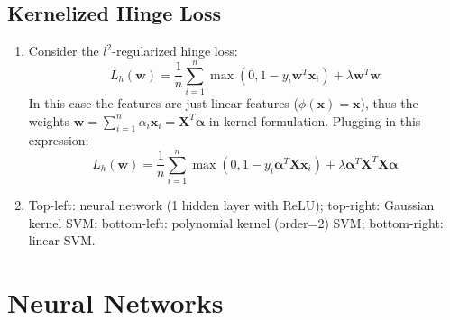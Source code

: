 \documentclass[a4paper, 10pt]{article}
\begin{document}
\subsection{Kernelized Hinge Loss}
\begin{enumerate}[label=(\alph*)]
    \item Consider the $l^2$-regularized hinge loss:
    \begin{equation}
        L_h(\mathbf{w}) = \frac{1}{n} \sum_{i=1}^n \max \left(0, 1 - y_i \mathbf{w}^T \mathbf{x}_i\right) + \lambda \mathbf{w}^T \mathbf{w}
    \end{equation}
    In this case the features are just linear features ($\phi(\mathbf{x}) = \mathbf{x}$), thus the weights $\mathbf{w} = \sum_{i=1}^n \alpha_i \mathbf{x}_i = \mathbf{X}^T \bm{\alpha}$ in kernel formulation. Plugging in this expression:
    \begin{equation}
        L_h(\mathbf{w}) = \frac{1}{n} \sum_{i=1}^n \max \left(0, 1 - y_i \bm{\alpha}^T \mathbf{X} \mathbf{x}_i\right) + \lambda \bm{\alpha}^T \mathbf{X}^T \mathbf{X} \bm{\alpha}
    \end{equation}
    
    \item Top-left: neural network (1 hidden layer with ReLU); top-right: Gaussian kernel SVM; bottom-left: polynomial kernel (order=2) SVM; bottom-right: linear SVM.
\end{enumerate}


\section{Neural Networks}
\end{document}
